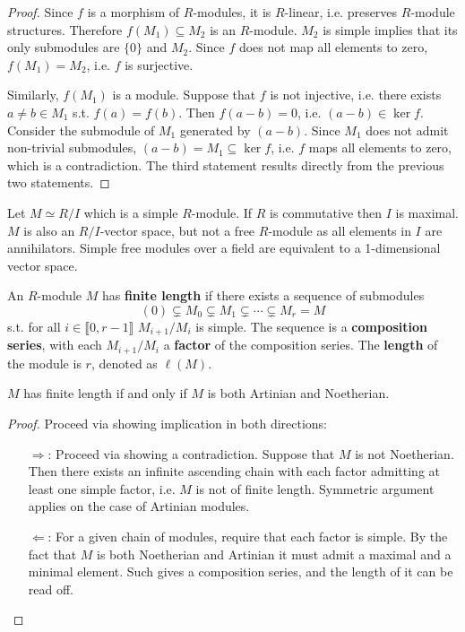 \documentclass{article}
\begin{document}
\begin{proof}
    Since $f$ is a morphism of $R$-modules, it is $R$-linear, i.e. preserves $R$-module structures. Therefore $f(M_1) \subseteq M_2$ is an $R$-module. $M_2$ is simple implies that its only submodules are $\{0\}$ and $M_2$. Since $f$ does not map all elements to zero, $f(M_1) = M_2$, i.e. $f$ is surjective.

    Similarly, $f(M_1)$ is a module. Suppose that $f$ is not injective, i.e. there exists $a\neq b \in M_1$ s.t. $f(a) = f(b)$. Then $f(a - b) = 0$, i.e. $(a - b)\in\ker f$. Consider the submodule of $M_1$ generated by $(a - b)$. Since $M_1$ does not admit non-trivial submodules, $(a - b) = M_1 \subseteq \ker f$, i.e. $f$ maps all elements to zero, which is a contradiction. The third statement results directly from the previous two statements.
\end{proof}

\begin{remark}
    Let $M\simeq R/I$ which is a simple $R$-module. If $R$ is commutative then $I$ is maximal. $M$ is also an $R/I$-vector space, but not a free $R$-module as all elements in $I$ are annihilators. Simple free modules over a field are equivalent to a 1-dimensional vector space.
\end{remark}

\begin{definition}
    An $R$-module $M$ has \textbf{finite length} if there exists a sequence of submodules
    \[
        (0) \subsetneq M_0 \subsetneq M_1 \subsetneq \cdots \subsetneq M_r = M
    \]
    s.t. for all $i\in\llbracket 0, r - 1 \rrbracket$ $M_{i+1}/M_i$ is simple. The sequence is a \textbf{composition series}, with each $M_{i+1}/M_i$ a \textbf{factor} of the composition series. The \textbf{length} of the module is $r$, denoted as $\ell(M)$.
\end{definition}

\begin{proposition}\label{prop:Finite length implies Noeth and Artin}
    $M$ has finite length if and only if $M$ is both Artinian and Noetherian.
\end{proposition}

\begin{proof}
    Proceed via showing implication in both directions:
    \begin{itemize}
        \item[$\Rightarrow$:] Proceed via showing a contradiction. Suppose that $M$ is not Noetherian. Then there exists an infinite ascending chain with each factor admitting at least one simple factor, i.e. $M$ is not of finite length. Symmetric argument applies on the case of Artinian modules.
        \item[$\Leftarrow$:] For a given chain of modules, require that each factor is simple. By the fact that $M$ is both Noetherian and Artinian it must admit a maximal and a minimal element. Such gives a composition series, and the length of it can be read off. 
    \end{itemize}
\end{proof}
\end{document}
